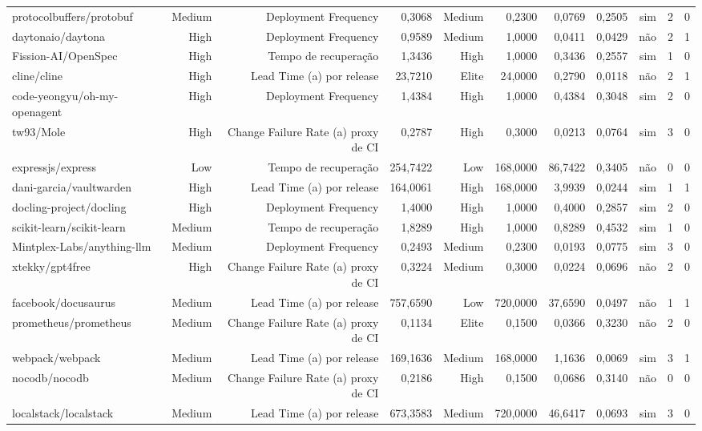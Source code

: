 \begin{tabular}{lrrrrrrrrrr}
protocolbuffers/protobuf & Medium & Deployment Frequency & 0,3068 & Medium & 0,2300 & 0,0769 & 0,2505 & sim & 2 & 0 \\
daytonaio/daytona & High & Deployment Frequency & 0,9589 & Medium & 1,0000 & 0,0411 & 0,0429 & não & 2 & 1 \\
Fission-AI/OpenSpec & High & Tempo de recuperação & 1,3436 & High & 1,0000 & 0,3436 & 0,2557 & sim & 1 & 0 \\
cline/cline & High & Lead Time (a) por release & 23,7210 & Elite & 24,0000 & 0,2790 & 0,0118 & não & 2 & 1 \\
code-yeongyu/oh-my-openagent & High & Deployment Frequency & 1,4384 & High & 1,0000 & 0,4384 & 0,3048 & sim & 2 & 0 \\
tw93/Mole & High & Change Failure Rate (a) proxy de CI & 0,2787 & High & 0,3000 & 0,0213 & 0,0764 & sim & 3 & 0 \\
expressjs/express & Low & Tempo de recuperação & 254,7422 & Low & 168,0000 & 86,7422 & 0,3405 & não & 0 & 0 \\
dani-garcia/vaultwarden & High & Lead Time (a) por release & 164,0061 & High & 168,0000 & 3,9939 & 0,0244 & sim & 1 & 1 \\
docling-project/docling & High & Deployment Frequency & 1,4000 & High & 1,0000 & 0,4000 & 0,2857 & sim & 2 & 0 \\
scikit-learn/scikit-learn & Medium & Tempo de recuperação & 1,8289 & High & 1,0000 & 0,8289 & 0,4532 & sim & 1 & 0 \\
Mintplex-Labs/anything-llm & Medium & Deployment Frequency & 0,2493 & Medium & 0,2300 & 0,0193 & 0,0775 & sim & 3 & 0 \\
xtekky/gpt4free & High & Change Failure Rate (a) proxy de CI & 0,3224 & Medium & 0,3000 & 0,0224 & 0,0696 & não & 2 & 0 \\
facebook/docusaurus & Medium & Lead Time (a) por release & 757,6590 & Low & 720,0000 & 37,6590 & 0,0497 & não & 1 & 1 \\
prometheus/prometheus & Medium & Change Failure Rate (a) proxy de CI & 0,1134 & Elite & 0,1500 & 0,0366 & 0,3230 & não & 2 & 0 \\
webpack/webpack & Medium & Lead Time (a) por release & 169,1636 & Medium & 168,0000 & 1,1636 & 0,0069 & sim & 3 & 1 \\
nocodb/nocodb & Medium & Change Failure Rate (a) proxy de CI & 0,2186 & High & 0,1500 & 0,0686 & 0,3140 & não & 0 & 0 \\
localstack/localstack & Medium & Lead Time (a) por release & 673,3583 & Medium & 720,0000 & 46,6417 & 0,0693 & sim & 3 & 0 \\

\end{tabular}

